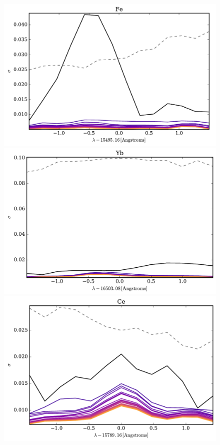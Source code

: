 \documentclass[a4paper,fleqn,usenatbib]{mnras}
\begin{document}
\begin{figure}
	\includegraphics[width=\columnwidth]{apogee_centers_final_29502_spc_win_wid_1p5_fe_conditional_stddevs.pdf}
	\includegraphics[width=\columnwidth]{apogee_centers_final_29502_spc_win_wid_1p5_yb_conditional_stddevs.pdf}
	\includegraphics[width=\columnwidth]{apogee_centers_final_29502_spc_win_wid_1p5_ce_conditional_stddevs.pdf}

\end{figure}
\end{document}
